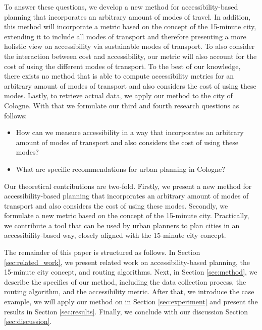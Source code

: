 To answer these questions, we develop a new method for accessibility-based planning that incorporates an arbitrary amount of modes of travel.
In addition, this method will incorporate a metric based on the concept of the 15-minute city, extending it to include all modes of transport and therefore presenting a more holistic view on accessibility via sustainable modes of transport.
To also consider the interaction between cost and accessibility, our metric will also account for the cost of using the different modes of transport.
To the best of our knowledge, there exists no method that is able to compute accessibility metrics for an arbitrary amount of modes of transport and also considers the cost of using these modes.
Lastly, to retrieve actual data, we apply our method to the city of Cologne.
With that we formulate our third and fourth research questions as follows:

\begin{itemize}
  \item How can we measure accessibility in a way that incorporates an arbitrary amount of modes of transport and also considers the cost of using these modes?
  \item What are specific recommendations for urban planning in Cologne?
\end{itemize}

Our theoretical contributions are two-fold.
Firstly, we present a new method for accessibility-based planning that incorporates an arbitrary amount of modes of transport and also considers the cost of using these modes.
Secondly, we formulate a new metric based on the concept of the 15-minute city.
Practically, we contribute a tool that can be used by urban planners to plan cities in an accessibility-based way, closely aligned with the 15-minute city concept.

The remainder of this paper is structured as follows.
In Section \ref{sec:related_work}, we present related work on accessibility-based planning, the 15-minute city concept, and routing algorithms.
Next, in Section \ref{sec:method}, we describe the specifics of our method, including the data collection process, the routing algorithm, and the accessibility metric.
After that, we introduce the case example, we will apply our method on in Section \ref{sec:experiment} and present the results in Section \ref{sec:results}.
Finally, we conclude with our discussion Section \ref{sec:discussion}.

